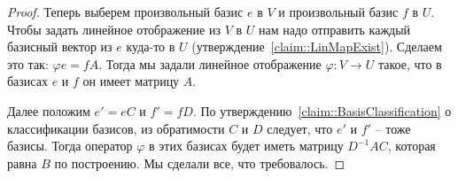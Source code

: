 \begin{proof}
Теперь выберем произвольный базис $e$ в $V$ и произвольный базис $f$ в $U$.
Чтобы задать линейное отображение из $V$ в $U$ нам надо отправить каждый базисный вектор из $e$ куда-то в $U$ (утверждение~\ref{claim::LinMapExist}).
Сделаем это так: $\varphi e = f A$.
Тогда мы задали линейное отображение $\varphi \colon V\to U$ такое, что в базисах $e$ и $f$ он имеет матрицу $A$.

Далее положим $e' = eC$ и $f' = fD$.
По утверждению~\ref{claim::BasisClassification} о классификации базисов, из обратимости $C$ и $D$ следует, что $e'$ и $f'$ -- тоже базисы.
Тогда оператор $\varphi$ в этих базисах будет иметь матрицу $D^{-1}AC$, которая равна $B$ по построению.
Мы сделали все, что требовалось.
\end{proof}
